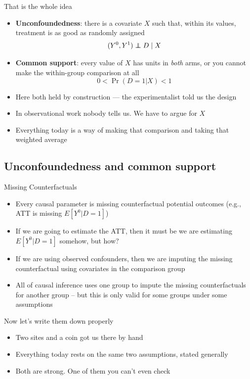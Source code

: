 \documentclass{beamer}
\newcommand{\highlight}[1]{\textcolor{accent}{\textbf{#1}}}
\newcommand\independent{\protect\mathpalette{\protect\independenT}{\perp}}
\def\independenT#1#2{\mathrel{\rlap{$#1#2$}\mkern2mu{#1#2}}}
\begin{document}
\begin{frame}{That is the whole idea}

\begin{itemize}
\item \highlight{Unconfoundedness}: there is a covariate $X$ such that, within its values, treatment is as good as randomly assigned
      $$(Y^0,Y^1) \independent{D} \mid X$$
\item \highlight{Common support}: every value of $X$ has units in \emph{both} arms, or you cannot make the within-group comparison at all
      $$0 < \Pr(D=1|X) < 1$$
\item Here both held by construction --- the experimentalist told us the design
\item In observational work nobody tells us. We have to argue for $X$
\item Everything today is a way of making that comparison and taking that weighted average
\end{itemize}

\end{frame}




\subsection{Unconfoundedness and common support}


\begin{frame}{Missing Counterfactuals}


\begin{itemize}
\item Every causal parameter is missing counterfactual potential outcomes (e.g., ATT is missing $E[Y^0|D=1]$)
\item If we are going to estimate the ATT, then it must be we are estimating $E[Y^0|D=1]$ somehow, but how?
\item If we are using observed confounders, then we are imputing the missing counterfactual using covariates in the comparison group
\item All of causal inference uses one group to impute the missing counterfactuals for another group -- but this is only valid for some groups under some assumptions

\end{itemize}


\end{frame}


\begin{frame}{Now let's write them down properly}

\begin{itemize}
\item Two sites and a coin got us there by hand
\item Everything today rests on the same two assumptions, stated generally
\item Both are strong. One of them you can't even check
\end{itemize}

\end{frame}
\end{document}
